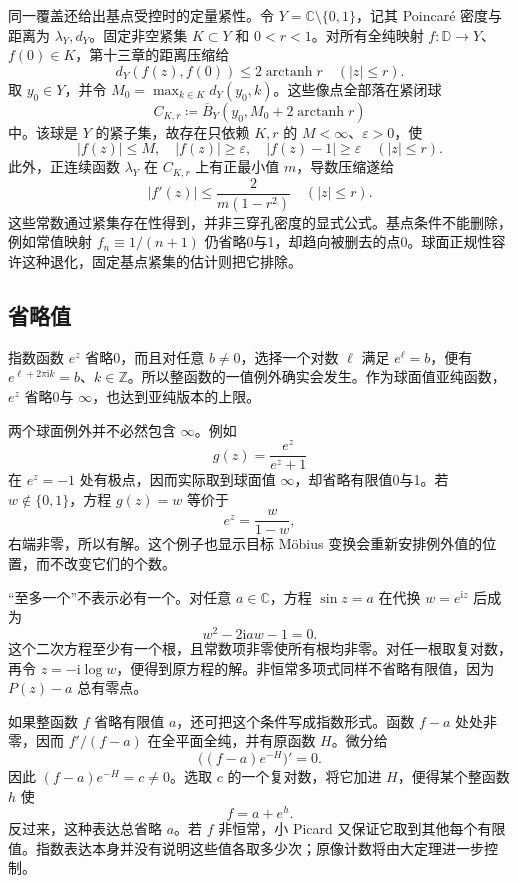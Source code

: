 \ProseParagraphBreak
同一覆盖还给出基点受控时的定量紧性。令 \(Y=\mathbb C\setminus\{0,1\}\)，记其 Poincaré 密度与距离为 \(\lambda_Y,d_Y\)。固定非空紧集 \(K\subset Y\) 和 \(0<r<1\)。对所有全纯映射 \(f:\mathbb D\to Y\)、\(f(0)\in K\)，第十三章的距离压缩给
\[
 d_Y(f(z),f(0))\le2\operatorname{arctanh}r
 \quad(|z|\le r).
\]
取 \(y_0\in Y\)，并令 \(M_0=\max_{k\in K}d_Y(y_0,k)\)。这些像点全部落在紧闭球
\[
 C_{K,r}\coloneqq
 \overline B_Y(y_0,M_0+2\operatorname{arctanh}r)
\]
中。该球是 \(Y\) 的紧子集，故存在只依赖 \(K,r\) 的 \(M<\infty\)、\(\varepsilon>0\)，使
\[
 |f(z)|\le M,\quad |f(z)|\ge\varepsilon,\quad
 |f(z)-1|\ge\varepsilon\quad(|z|\le r).
\]
此外，正连续函数 \(\lambda_Y\) 在 \(C_{K,r}\) 上有正最小值 \(m\)，导数压缩遂给
\[
 |f'(z)|\le\frac{2}{m(1-r^2)}\quad(|z|\le r).
\]
这些常数通过紧集存在性得到，并非三穿孔密度的显式公式。基点条件不能删除，例如常值映射 \(f_n\equiv1/(n+1)\) 仍省略0与1，却趋向被删去的点0。球面正规性容许这种退化，固定基点紧集的估计则把它排除。

\subsection{省略值}
\label{b3:subsec:140402}

指数函数 \(e^z\) 省略0，而且对任意 \(b\ne0\)，选择一个对数 \(\ell\) 满足 \(e^\ell=b\)，便有 \(e^{\ell+2\pi\mathrm i k}=b\)、\(k\in\mathbb Z\)。所以整函数的一值例外确实会发生。作为球面值亚纯函数，\(e^z\) 省略0与 \(\infty\)，也达到亚纯版本的上限。

\ProseParagraphBreak
两个球面例外并不必然包含 \(\infty\)。例如
\[
 g(z)=\frac{e^z}{e^z+1}
\]
在 \(e^z=-1\) 处有极点，因而实际取到球面值 \(\infty\)，却省略有限值0与1。若 \(w\notin\{0,1\}\)，方程 \(g(z)=w\) 等价于
\[
 e^z=\frac{w}{1-w},
\]
右端非零，所以有解。这个例子也显示目标 Möbius 变换会重新安排例外值的位置，而不改变它们的个数。

\ProseParagraphBreak
“至多一个”不表示必有一个。对任意 \(a\in\mathbb C\)，方程 \(\sin z=a\) 在代换 \(w=e^{\mathrm i z}\) 后成为
\[
 w^2-2\mathrm i a w-1=0.
\]
这个二次方程至少有一个根，且常数项非零使所有根均非零。对任一根取复对数，再令 \(z=-\mathrm i\log w\)，便得到原方程的解。非恒常多项式同样不省略有限值，因为 \(P(z)-a\) 总有零点。

\ProseParagraphBreak
如果整函数 \(f\) 省略有限值 \(a\)，还可把这个条件写成指数形式。函数 \(f-a\) 处处非零，因而 \(f'/(f-a)\) 在全平面全纯，并有原函数 \(H\)。微分给
\[
 \bigl((f-a)e^{-H}\bigr)'=0.
\]
因此 \((f-a)e^{-H}=c\ne0\)。选取 \(c\) 的一个复对数，将它加进 \(H\)，便得某个整函数 \(h\) 使
\[
 f=a+e^h.
\]
反过来，这种表达总省略 \(a\)。若 \(f\) 非恒常，小 Picard 又保证它取到其他每个有限值。指数表达本身并没有说明这些值各取多少次；原像计数将由大定理进一步控制。

